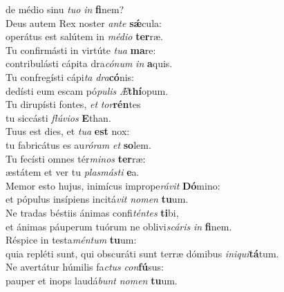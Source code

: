 \evenverse de médio sinu \textit{tu}\textit{o} \textit{in} \textbf{fi}nem?\\
\oddverse Deus autem Rex noster \textit{an}\textit{te} \textbf{sǽ}cula:~\*\\
\oddverse operátus est salútem in \textit{mé}\textit{di}\textit{o} \textbf{ter}ræ.\\
\evenverse Tu confirmásti in virtúte \textit{tu}\textit{a} \textbf{ma}re:~\*\\
\evenverse contribulásti cápita dra\textit{có}\textit{num} \textit{in} \textbf{a}quis.\\
\oddverse Tu confregísti cápi\textit{ta} \textit{dra}\textbf{có}nis:~\*\\
\oddverse dedísti eum escam pó\textit{pu}\textit{lis} \textit{Æ}\textbf{thí}opum.\\
\evenverse Tu dirupísti fontes, \textit{et} \textit{tor}\textbf{rén}tes~\*\\
\evenverse tu siccásti \textit{flú}\textit{vi}\textit{os} \textbf{E}than.\\
\oddverse Tuus est dies, et \textit{tu}\textit{a} \textbf{est} nox:~\*\\
\oddverse tu fabricátus es au\textit{ró}\textit{ram} \textit{et} \textbf{so}lem.\\
\evenverse Tu fecísti omnes tér\textit{mi}\textit{nos} \textbf{ter}ræ:~\*\\
\evenverse æstátem et ver tu \textit{plas}\textit{má}\textit{sti} \textbf{e}a.\\
\oddverse Memor esto hujus, inimícus imprope\textit{rá}\textit{vit} \textbf{Dó}mino:~\*\\
\oddverse et pópulus insípiens incitá\textit{vit} \textit{no}\textit{men} \textbf{tu}um.\\
\evenverse Ne tradas béstiis ánimas confi\textit{tén}\textit{tes} \textbf{ti}bi,~\*\\
\evenverse et ánimas páuperum tuórum ne oblivi\textit{scá}\textit{ris} \textit{in} \textbf{fi}nem.\\
\oddverse Réspice in testa\textit{mén}\textit{tum} \textbf{tu}um:~\*\\
\oddverse quia repléti sunt, qui obscuráti sunt terræ dómibus \textit{i}\textit{ni}\textit{qui}\textbf{tá}tum.\\
\evenverse Ne avertátur húmilis fa\textit{ctus} \textit{con}\textbf{fú}sus:~\*\\
\evenverse pauper et inops laudá\textit{bunt} \textit{no}\textit{men} \textbf{tu}um.\\
